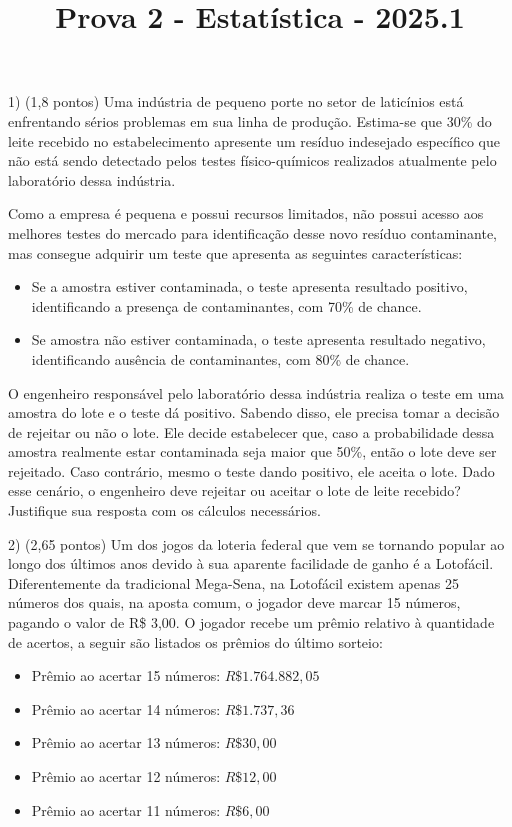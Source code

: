 \documentclass[12pt]{article}
\title{Prova 2 - Estatística - 2025.1}
\begin{document}
\date{}
\maketitle

1) (1,8 pontos) Uma  indústria de pequeno porte no setor de laticínios  está enfrentando sérios problemas em sua linha de produção.
 Estima-se que 30\% do leite recebido no estabelecimento apresente um resíduo indesejado específico que não está sendo detectado pelos testes físico-químicos realizados atualmente pelo laboratório dessa indústria. 

Como a empresa é pequena e possui recursos limitados, não possui acesso aos melhores testes do mercado para identificação desse novo resíduo contaminante,
mas consegue adquirir um teste que apresenta as seguintes características:
 
\begin{itemize}
    \item Se a amostra estiver contaminada, o teste apresenta resultado positivo, identificando a presença de contaminantes, com 70\% de chance.
    \item Se amostra não estiver contaminada, o teste apresenta resultado negativo, identificando ausência de contaminantes, com 80\% de chance.
\end{itemize}

O engenheiro responsável pelo laboratório dessa indústria realiza o teste em uma amostra do lote e o teste dá positivo. 
Sabendo disso, ele precisa tomar a decisão de rejeitar ou não o lote. 
Ele decide estabelecer que, caso a probabilidade dessa amostra realmente estar contaminada seja maior que 50\%, então o lote deve ser rejeitado.
Caso contrário, mesmo o teste dando positivo, ele aceita o lote. Dado esse cenário, o engenheiro deve rejeitar ou aceitar o lote de leite recebido? Justifique sua resposta com os cálculos necessários. 


\vspace{5px}

2) (2,65 pontos) Um dos jogos da loteria federal que vem se tornando popular ao longo dos últimos anos devido à sua aparente facilidade de ganho é a Lotofácil.
 Diferentemente da tradicional Mega-Sena, na Lotofácil existem apenas 25 números dos quais, na aposta comum, o jogador
deve marcar 15 números, pagando o valor de R\$ 3,00. O jogador recebe um prêmio relativo à quantidade de acertos, a seguir são listados os prêmios do último sorteio:
\begin{itemize}
    \item Prêmio ao acertar 15 números: 	$R\$ 1.764.882,05$
    \item Prêmio ao acertar 14 números: 	$R\$ 1.737,36$
    \item Prêmio ao acertar 13 números: 	$R\$ 30,00$
    \item Prêmio ao acertar 12 números: 	$R\$ 12,00$
    \item Prêmio ao acertar 11 números: 	$R\$ 6,00$ 
\end{itemize}
\end{document}
